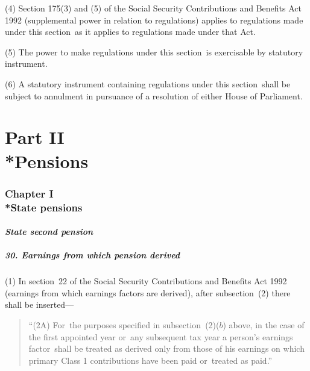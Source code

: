 \documentclass[12pt,a4paper]{article}
\begin{document}
(4) Section 175(3)  and (5)  of the Social Security Contributions and Benefits Act 1992 (supplemental power in relation to regulations) applies to regulations made under this section~as it applies to regulations made under that Act.

(5) The power to make regulations under this section~is exercisable by statutory instrument.

(6) A statutory instrument containing regulations under this section~shall be subject to annulment in pursuance of a resolution of either House of Parliament.

\vfill


\part[Part II --- Pensions]{Part II\\*Pensions}


\section[Chapter I --- State pensions]{Chapter I\\*State pensions}

\renewcommand\parthead{--- Part II Chapter I}

\subsection{\itshape State second pension}

\subsubsection{30. Earnings from which pension derived}

(1) In section~22 of the Social Security Contributions and Benefits Act 1992 (earnings from which earnings factors are derived), after subsection~(2)  there shall be inserted—
\begin{quotation}
“(2A) For~the purposes specified in subsection~(2)($b$)  above, in the case of the first appointed year or~any subsequent tax year a person’s earnings factor~shall be treated as derived only from those of his earnings on which primary Class 1 contributions have been paid or~treated as paid.”
\end{quotation}
\end{document}
